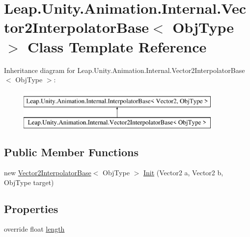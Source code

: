 \hypertarget{class_leap_1_1_unity_1_1_animation_1_1_internal_1_1_vector2_interpolator_base}{}\section{Leap.\+Unity.\+Animation.\+Internal.\+Vector2\+Interpolator\+Base$<$ Obj\+Type $>$ Class Template Reference}
\label{class_leap_1_1_unity_1_1_animation_1_1_internal_1_1_vector2_interpolator_base}
Inheritance diagram for Leap.\+Unity.\+Animation.\+Internal.\+Vector2\+Interpolator\+Base$<$ Obj\+Type $>$\+:\begin{figure}[H]
\begin{center}
\leavevmode
\includegraphics[height=2.000000cm]{class_leap_1_1_unity_1_1_animation_1_1_internal_1_1_vector2_interpolator_base}
\end{center}
\end{figure}
\subsection*{Public Member Functions}
\begin{DoxyCompactItemize}
\item 
new \mbox{\hyperlink{class_leap_1_1_unity_1_1_animation_1_1_internal_1_1_vector2_interpolator_base}{Vector2\+Interpolator\+Base}}$<$ Obj\+Type $>$ \mbox{\hyperlink{class_leap_1_1_unity_1_1_animation_1_1_internal_1_1_vector2_interpolator_base_ab11720cce14e8520d8018c95e042e664}{Init}} (Vector2 a, Vector2 b, Obj\+Type target)
\end{DoxyCompactItemize}
\subsection*{Properties}
\begin{DoxyCompactItemize}
\item 
override float \mbox{\hyperlink{class_leap_1_1_unity_1_1_animation_1_1_internal_1_1_vector2_interpolator_base_a4f72ce916bc43d64a37dc418727bbca9}{length}}
\end{DoxyCompactItemize}
